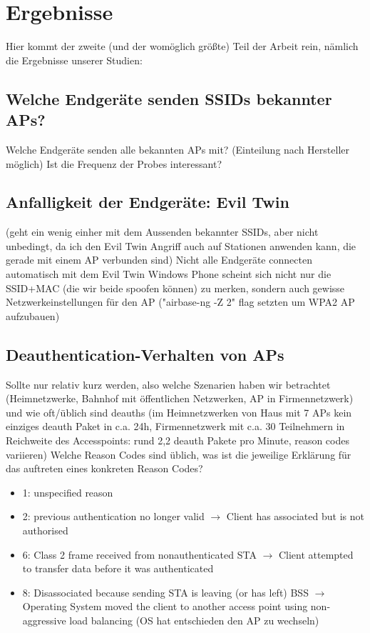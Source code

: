 \section{Ergebnisse}
Hier kommt der zweite (und der womöglich größte) Teil der Arbeit rein, nämlich die Ergebnisse unserer Studien:

\subsection{Welche Endgeräte senden SSIDs bekannter APs?}
Welche Endgeräte senden alle bekannten APs mit? (Einteilung nach Hersteller möglich)  
Ist die Frequenz der Probes interessant?

\subsection{Anfalligkeit der Endgeräte: Evil Twin}
(geht ein wenig einher mit dem Aussenden bekannter SSIDs, aber nicht unbedingt, da ich den Evil Twin Angriff auch auf Stationen anwenden kann, die gerade mit einem AP verbunden sind)
Nicht alle Endgeräte connecten automatisch mit dem Evil Twin
Windows Phone scheint sich nicht nur die SSID+MAC (die wir beide spoofen können) zu merken, sondern auch gewisse Netzwerkeinstellungen für den AP ("airbase-ng -Z 2" flag setzten um WPA2 AP aufzubauen)

\subsection{Deauthentication-Verhalten von APs}
Sollte nur relativ kurz werden, also welche Szenarien haben wir betrachtet (Heimnetzwerke, Bahnhof mit öffentlichen Netzwerken, AP in Firmennetzwerk) und wie oft/üblich sind deauths (im Heimnetzwerken von Haus mit 7 APs kein einziges deauth Paket in c.a. 24h, Firmennetzwerk mit c.a. 30 Teilnehmern in Reichweite des Accesspoints: rund 2,2 deauth Pakete pro Minute, reason codes variieren)
Welche Reason Codes sind üblich, was ist die jeweilige Erklärung für das auftreten eines konkreten Reason Codes?
\begin{itemize}
	\item 1: unspecified reason 
    \item 2: previous authentication no longer valid $\rightarrow$ Client has associated but is not authorised
    \item 6: Class 2 frame received from nonauthenticated STA $\rightarrow$ Client attempted to transfer data before it was authenticated
   	\item 8: Disassociated because sending STA is leaving (or has left) BSS $\rightarrow$ Operating System moved the client to another access point using non-aggressive load balancing (OS hat entschieden den AP zu wechseln)  
\end{itemize}